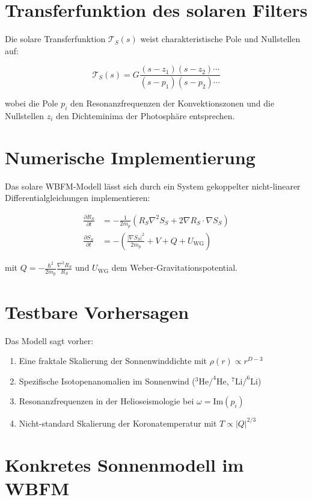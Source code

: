 \section{Transferfunktion des solaren Filters}

Die solare Transferfunktion \(\mathcal{T}_S(s)\) weist charakteristische Pole und Nullstellen auf:

\[
\mathcal{T}_S(s) = G \frac{(s - z_1)(s - z_2)\cdots}{(s - p_1)(s - p_2)\cdots}
\]

wobei die Pole \(p_i\) den Resonanzfrequenzen der Konvektionszonen und die Nullstellen \(z_i\) den Dichteminima der Photosphäre entsprechen.

\section{Numerische Implementierung}

Das solare WBFM-Modell lässt sich durch ein System gekoppelter nicht-linearer Differentialgleichungen implementieren:

\begin{align*}
\frac{\partial R_S}{\partial t} &= -\frac{1}{2m_p}\left(R_S \nabla^2 S_S + 2\nabla R_S \cdot \nabla S_S\right) \\
\frac{\partial S_S}{\partial t} &= -\left(\frac{|\nabla S_S|^2}{2m_p} + V + Q + U_{\text{WG}}\right)
\end{align*}

mit \(Q = -\frac{\hbar^2}{2m_p}\frac{\nabla^2 R_S}{R_S}\) und \(U_{\text{WG}}\) dem Weber-Gravitationspotential.

\section{Testbare Vorhersagen}

Das Modell sagt vorher:
\begin{enumerate}
\item Eine fraktale Skalierung der Sonnenwinddichte mit \(\rho(r) \propto r^{D-3}\)
\item Spezifische Isotopenanomalien im Sonnenwind (\(^3\text{He}/^4\text{He}\), \(^7\text{Li}/^6\text{Li}\))
\item Resonanzfrequenzen in der Helioseismologie bei \(\omega = \text{Im}(p_i)\)
\item Nicht-standard Skalierung der Koronatemperatur mit \(T \propto |Q|^{2/3}\)
\end{enumerate}

\section{Konkretes Sonnenmodell im WBFM}

